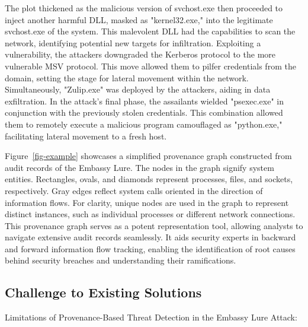 The plot thickened as the malicious version of svchost.exe then proceeded to inject another harmful DLL, masked as "kernel32.exe," into the legitimate svchost.exe of the system. This malevolent DLL had the capabilities to scan the network, identifying potential new targets for infiltration.
Exploiting a vulnerability, the attackers downgraded the Kerberos protocol to the more vulnerable MSV protocol. This move allowed them to pilfer credentials from the domain, setting the stage for lateral movement within the network. Simultaneously, "Zulip.exe" was deployed by the attackers, aiding in data exfiltration.
In the attack's final phase, the assailants wielded "psexec.exe" in conjunction with the previously stolen credentials. This combination allowed them to remotely execute a malicious program camouflaged as "python.exe," facilitating lateral movement to a fresh host.

Figure~\ref{fig-example} showcases a simplified provenance graph constructed from audit records of the Embassy Lure. The nodes in the graph signify system entities. Rectangles, ovals, and diamonds represent processes, files, and sockets, respectively. Gray edges reflect system calls oriented in the direction of information flows. For clarity, unique nodes are used in the graph to represent distinct instances, such as individual processes or different network connections. This provenance graph serves as a potent representation tool, allowing analysts to navigate extensive audit records seamlessly. It aids security experts in backward and forward information flow tracking, enabling the identification of root causes behind security breaches and understanding their ramifications.


\subsection{Challenge to Existing Solutions}
Limitations of Provenance-Based Threat Detection in the Embassy Lure Attack:

